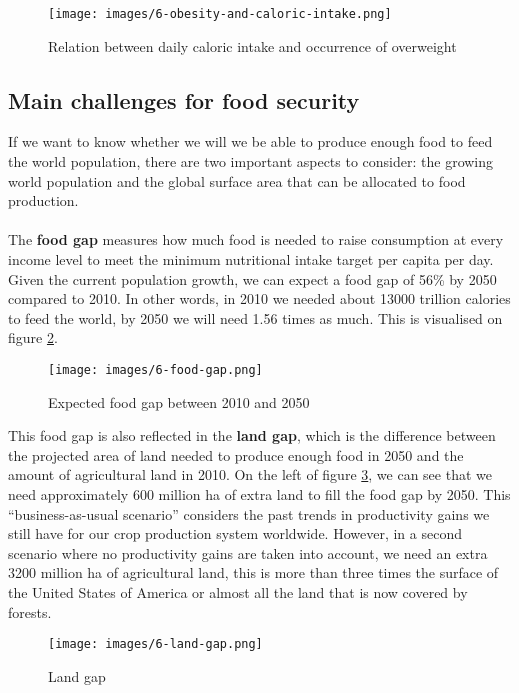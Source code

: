 \documentclass[../summary.tex]{subfiles}
\begin{document}
\begin{figure}[htbp]
	\centering
	\texttt{[image: images/6-obesity-and-caloric-intake.png]}
	\caption{Relation between daily caloric intake and occurrence of overweight}
	\label{fig:obesity-and-caloric-intake}
\end{figure}

\subsection{Main challenges for food security}

If we want to know whether we will we be able to produce enough food to feed the world population, there are two important aspects to consider: the growing world population and the global surface area that can be allocated to food production.
\\\\
The \textbf{food gap} measures how much food is needed to raise consumption at every income level to meet the minimum nutritional intake target per capita per day. Given the current population growth, we can expect a food gap of 56\% by 2050 compared to 2010. In other words, in 2010 we needed about 13000 trillion calories to feed the world, by 2050 we will need 1.56 times as much. This is visualised on figure \ref{fig:food_gap}.

\begin{figure}[htbp]
	\centering
	\texttt{[image: images/6-food-gap.png]}
	\caption{Expected food gap between 2010 and 2050}
	\label{fig:food_gap}
\end{figure}

This food gap is also reflected in the \textbf{land gap}, which is the difference between the projected area of land needed to produce enough food in 2050 and the amount of agricultural land in 2010. On the left of figure \ref{fig:land_gap}, we can see that we need approximately 600 million \unit{\hectare} of extra land to fill the food gap by 2050. This “business-as-usual scenario” considers the past trends in productivity gains we still have for our crop production system worldwide. However, in a second scenario where no productivity gains are taken into account, we need an extra 3200 million \unit{\hectare} of agricultural land, this is more than three times the surface of the United States of America or almost all the land that is now covered by forests.
\\
\begin{figure}[htbp]
	\centering
	\texttt{[image: images/6-land-gap.png]}
	\caption{Land gap}
	\label{fig:land_gap}
\end{figure}
\end{document}
